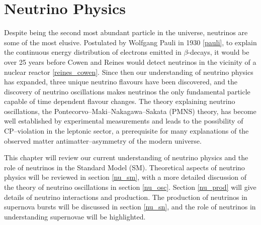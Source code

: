 \chapter{\label{ch:2-neutrinophysics}Neutrino Physics} 


 

\minitoc

Despite being the second most abundant particle in the universe, neutrinos are 
some of the most elusive. Postulated by Wolfgang Pauli in 1930 \ref{pauli}, to 
explain the continuous energy distribution of electrons emitted in 
\(\beta\)-decays, it would be over 25 years before Cowen and Reines would detect 
neutrinos in the vicinity of a nuclear reactor \ref{reines_cowen}. Since then
our understanding of neutrino physics has expanded, three unique neutrino 
flavours have been discovered, and the discovery of neutrino oscillations makes 
neutrinos the only fundamental particle capable of time dependent flavour 
changes. The theory explaining neutrino oscillations, the 
Pontecorvo–Maki–Nakagawa–Sakata (PMNS) theory, has become well established by 
experimental measurements and leads to the possibility of CP--violation in the 
leptonic sector, a prerequisite for many explanations of the observed matter 
antimatter--asymmetry of the modern universe. 

This chapter will review our current understanding of neutrino physics and the 
role of neutrinos in the Standard Model (SM).  Theoretical aspects of neutrino 
physics will be reviewed in section \ref{nu_sm}, with a more detailed 
discussion of the theory of neutrino oscillations in section \ref{nu_osc}.  
Section \ref{nu_prod} will give details of neutrino interactions and production. 
The production of neutrinos in supernova bursts will be discussed in section 
\ref{nu_sn}, and the role of neutrinos in understanding supernovae will be 
highlighted.

